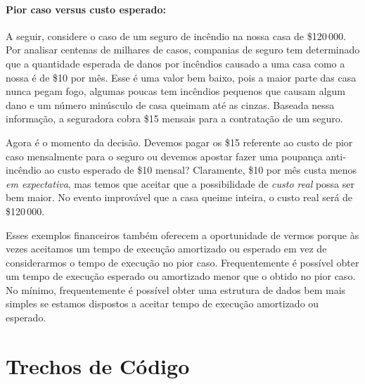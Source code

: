 \paragraph{Pior caso versus custo esperado:}
%
A seguir, considere o caso de um seguro de incêndio na nossa casa de \$120\,000.
Por analisar centenas de milhares de casos, companias de seguro tem determinado que a quantidade esperada de danos por incêndios causado a uma casa como a nossa é de
\$10 por mês.  
Esse é uma valor bem baixo, pois a maior parte das casa nunca pegam fogo, algumas poucas tem incêndios pequenos que causam algum dano e um número minúsculo de casa queimam até as cinzas. Baseada nessa informação, a seguradora cobra
\$15 mensais para a contratação de um seguro.

Agora é o momento da decisão. Devemos pagar os 
 \$15 referente ao custo de pior caso mensalmente para o seguro ou devemos
apostar fazer uma poupança anti-incêndio ao custo esperado de
\$10 mensal?  Claramente, \$10 por mês custa menos \emph{em expectativa},
mas temos que aceitar que a possibilidade de \emph{custo real} possa ser bem maior.
No evento improvável que a casa queime inteira, o custo real será de \$120\,000.

Esses exemplos financeiros também oferecem a oportunidade de vermos porque às vezes aceitamos um tempo de execução amortizado ou esperado em vez de considerarmos o tempo de execução no pior caso. Frequentemente é possível obter um tempo de execução esperado ou amortizado menor que o obtido no pior caso. 
No mínimo, frequentemente é possível obter uma estrutura de dados bem mais simples se estamos dispostos a aceitar tempo de execução amortizado ou esperado.


\section{Trechos de Código}

